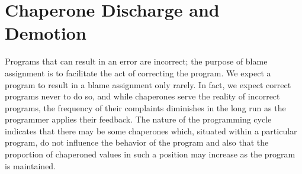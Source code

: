 \section{Chaperone Discharge and Demotion}

Programs that can result in an error are incorrect; the purpose of blame assignment is to facilitate the act of correcting the program.
We expect a program to result in a blame assignment only rarely.
In fact, we expect correct programs never to do so, and while chaperones serve the reality of incorrect programs, the frequency of their complaints diminishes in the long run as the programmer applies their feedback.
The nature of the programming cycle indicates that there may be some chaperones which, situated within a particular program, do not influence the behavior of the program and also that the proportion of chaperoned values in such a position may increase as the program is maintained.








